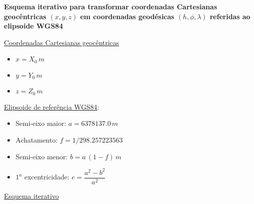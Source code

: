 \documentclass[10pt,a4paper]{article}
\author{Vanderlei C. Oliveira Jr.}
\begin{document}
\begin{center}
\begin{large}
\textbf{Esquema iterativo para transformar coordenadas Cartesianas 
geocêntricas $(x,y,z)$ em coordenadas geodésicas $(h,\phi,\lambda)$
referidas ao elipsoide WGS84}
\end{large}
\end{center}

\bigskip
\bigskip

\underline{Coordenadas Cartesianas geocêntricas}

\begin{itemize}
\item $x = X_{0} \, m$ 
\item $y = Y_{0} \, m$
\item $z = Z_{0} \, m$
\end{itemize}

\bigskip

\underline{Elipsoide de refer\^{e}ncia WGS84}:

\begin{itemize}
\item Semi-eixo maior: $a = 6378137.0 \, m$
\item Achatamento: $f = 1/298.257223563$
\item Semi-eixo menor: $b = a \, (1 - f) \, m$
\item $1^{a}$ excentricidade: $e = \dfrac{a^{2} - b^{2}}{a^{2}}$
\end{itemize}

\bigskip

\underline{Esquema iterativo}
\end{document}
